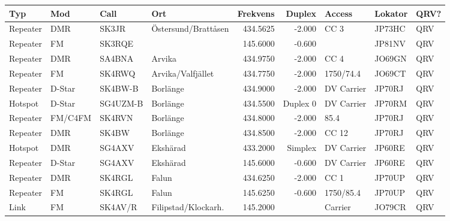 {\begin{landscape}
\begin{longtable}{llllrrlll}
	\bf Typ               & \bf Mod    & \bf Call & \bf Ort                & \bf Frekvens & \bf Duplex & \bf Access        & \bf Lokator & \bf QRV? \\ \hline
	\endhead
    Repeater & DMR        & SK3JR    & Östersund/Brattåsen    &     434.5625 &     -2.000 & CC 3              & JP73HC      & QRV      \\
	Repeater              & FM         & SK3RQE   &                        &     145.6000 &     -0.600 &                   & JP81NV      & QRV      \\
	Repeater              & DMR        & SA4BNA   & Arvika                 &     434.9750 &     -2.000 & CC 4              & JO69GN      & QRV      \\
	Repeater              & FM         & SK4RWQ   & Arvika/Valfjället      &     434.7750 &     -2.000 & 1750/74.4         & JO69CT      & QRV      \\
	Repeater              & D-Star     & SK4BW-B  & Borlänge               &     434.9000 &     -2.000 & DV Carrier        & JP70RJ      & QRV      \\
	Hotspot               & D-Star     & SG4UZM-B & Borlänge               &     434.5500 &   Duplex 0 & DV Carrier        & JP70RM      & QRV      \\
	Repeater              & FM/C4FM    & SK4RVN   & Borlänge               &     434.8000 &     -2.000 & 85.4              & JP70RJ      & QRV      \\
	Repeater              & DMR        & SK4BW    & Borlänge               &     434.8500 &     -2.000 & CC 12             & JP70RJ      & QRV      \\
	Hotspot               & DMR        & SG4AXV   & Ekshärad               &     433.2000 &    Simplex & DV Carrier        & JP60RE      & QRV      \\
	Repeater              & D-Star     & SG4AXV   & Ekshärad               &     145.6000 &     -0.600 & DV Carrier        & JP60RE      & QRV      \\
	Repeater              & DMR        & SK4RGL   & Falun                  &     434.6250 &     -2.000 & CC 1              & JP70UP      & QRV      \\
	Repeater              & FM         & SK4RGL   & Falun                  &     145.6250 &     -0.600 & 1750/85.4         & JP70UP      & QRV      \\
	Link                  & FM         & SK4AV/R  & Filipstad/Klockarh.    &     145.2000 &            & Carrier           & JO79CR      & QRV      \\

\end{longtable}
\end{landscape}}
